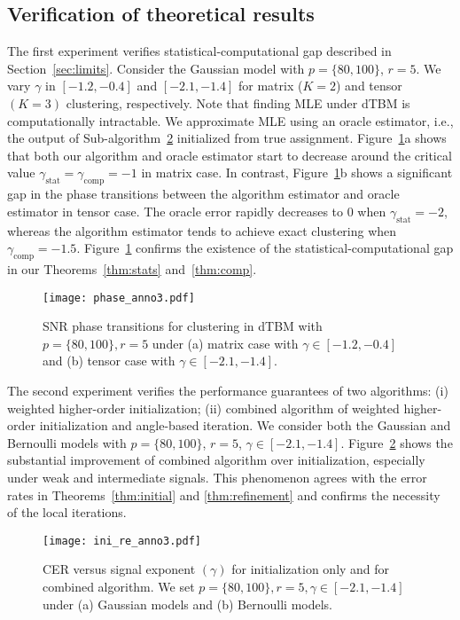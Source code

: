 \documentclass[lettersize,onecolumn,journal]{IEEEtran}
\theoremstyle{definition}
\theoremstyle{definition}
\begin{document}
\subsection{Verification of theoretical results}\label{subsec:num_theory}

The first experiment verifies  statistical-computational gap described in Section~\ref{sec:limits}. Consider the Gaussian model with $p = \{80, 100\}$, $r = 5$. We vary $\gamma $ in $ [-1.2, -0.4]$ and $[-2.1, -1.4]$ for matrix ($K=2$) and tensor $(K = 3)$ clustering, respectively. Note that finding MLE under dTBM is computationally intractable. We approximate MLE using an oracle estimator, i.e., the output of Sub-algorithm~\hyperref[alg:main]{2} initialized from true assignment. Figure~\ref{fig:phase}a shows that both our algorithm and oracle estimator start to decrease around the critical value $\gamma_{\text{stat}}  = \gamma_{\text{comp}}  = -1$ in matrix case. In contrast, Figure~\ref{fig:phase}b shows a significant gap in the phase transitions between the algorithm estimator and oracle estimator in tensor case. The oracle error rapidly decreases to 0 when $\gamma_{\text{stat}} = -2$, whereas the algorithm estimator tends to achieve exact clustering when $\gamma_{\text{comp}} = -1.5$. Figure~\ref{fig:phase} confirms the existence of the statistical-computational gap in our Theorems~\ref{thm:stats} and~\ref{thm:comp}. 


\begin{figure}[htb]
    \centering
    \texttt{[image: phase\_anno3.pdf]}
    \caption{SNR phase transitions for clustering in dTBM with $p = \{80, 100\}, r = 5$ under (a) matrix case with $\gamma \in [-1.2, -0.4]$ and (b) tensor case with $ \gamma \in [-2.1, -1.4]$.
    }
    \label{fig:phase}
\end{figure}

The second experiment verifies the performance guarantees of two algorithms: (i) weighted higher-order initialization; (ii) combined algorithm of weighted higher-order initialization and angle-based iteration. We consider both the Gaussian and Bernoulli models with $p = \{80, 100\}$, $r = 5$, $\gamma \in [-2.1, -1.4]$. Figure~\ref{fig:ini_re} shows the substantial improvement of combined algorithm over initialization, especially under weak and intermediate signals. This phenomenon agrees with the error rates in Theorems~\ref{thm:initial} and \ref{thm:refinement} 
and confirms the necessity of the local iterations.

\begin{figure}[htp!]
    \centering
     \texttt{[image: ini\_re\_anno3.pdf]}
    \caption{CER versus signal exponent $(\gamma)$ for initialization only and for combined algorithm. We set $p = \{80, 100\}, r = 5, \gamma \in [-2.1, -1.4]$ under (a) Gaussian models and (b) Bernoulli models. }
    \label{fig:ini_re}

\end{figure}
\end{document}
